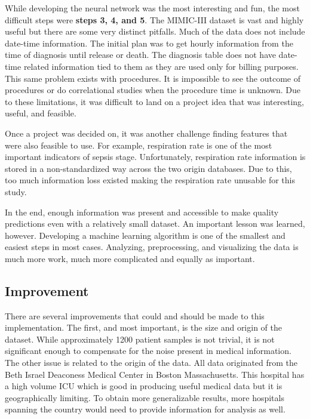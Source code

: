\documentclass[11pt]{article}
\begin{document}
    While developing the neural network was the most interesting and fun, the most difficult steps were \textbf{steps 3, 4, and 5}. The MIMIC-III dataset is vast and highly useful but there are some very distinct pitfalls. Much of the data does not include date-time information. The initial plan was to get hourly information from the time of diagnosis until release or death. The diagnosis table does not have date-time related information tied to them as they are used only for billing purposes. This same problem exists with procedures. It is impossible to see the outcome of procedures or do correlational studies when the procedure time is unknown. Due to these limitations, it was difficult to land on a project idea that was interesting, useful, and feasible.

	Once a project was decided on, it was another challenge finding features that were also feasible to use. For example, respiration rate is one of the most important indicators of sepsis stage. Unfortunately, respiration rate information is stored in a non-standardized way across the two origin databases. Due to this, too much information loss existed making the respiration rate unusable for this study.

	In the end, enough information was present and accessible to make quality predictions even with a relatively small dataset. An important lesson was learned, however. Developing a machine learning algorithm is one of the smallest and easiest steps in most cases. Analyzing, preprocessing, and visualizing the data is much more work, much more complicated and equally as important.
	
	\subsection{Improvement}
	There are several improvements that could and should be made to this implementation. The first, and most important, is the size and origin of the dataset. While approximately 1200 patient samples is not trivial, it is not significant enough to compensate for the noise present in medical information. The other issue is related to the origin of the data. All data originated from the Beth Israel Deaconess Medical Center in Boston Massachusetts. This hospital has a high volume ICU which is good in producing useful medical data but it is geographically limiting. To obtain more generalizable results, more hospitals spanning the country would need to provide information for analysis as well.
	
	
	{}
	
	
\end{document}
